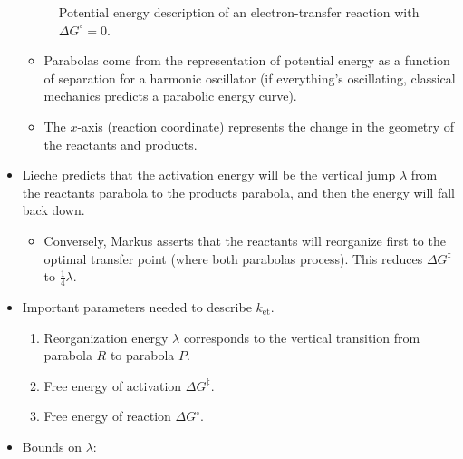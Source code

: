 \documentclass[../notes.tex]{subfiles}
\begin{document}
\begin{itemize}
\begin{figure}[H]
        \caption{Potential energy description of an electron-transfer reaction with $\Delta G^\circ=0$.}
        \label{fig:potentialEnergyParabolas}
    \end{figure}
    \begin{itemize}
        \item Parabolas come from the representation of potential energy as a function of separation for a harmonic oscillator (if everything's oscillating, classical mechanics predicts a parabolic energy curve).
        \item The $x$-axis (reaction coordinate) represents the change in the geometry of the reactants and products.
    \end{itemize}
    \item Lieche predicts that the activation energy will be the vertical jump $\lambda$ from the reactants parabola to the products parabola, and then the energy will fall back down.
    \begin{itemize}
        \item Conversely, Markus asserts that the reactants will reorganize first to the optimal transfer point (where both parabolas process). This reduces $\Delta G^\ddagger$ to $\frac{1}{4}\lambda$.
    \end{itemize}
    \item Important parameters needed to describe $k_\text{et}$.
    \begin{enumerate}
        \item Reorganization energy $\lambda$ corresponds to the vertical transition from parabola $R$ to parabola $P$.
        \item Free energy of activation $\Delta G^\ddagger$.
        \item Free energy of reaction $\Delta G^\circ$.
    \end{enumerate}
    \item Bounds on $\lambda$:
    \begin{itemize}

\end{itemize}
\end{itemize}
\end{document}
